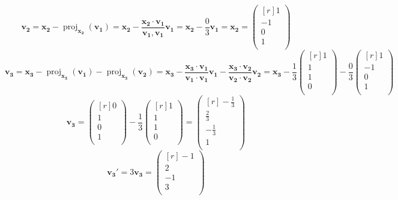 \documentclass{article}
\begin{document}
\[
\mathbf{v_2} = \mathbf{x_2} - \operatorname{proj}_{\mathbf{x_2}}(\mathbf{v_1}) = \mathbf{x_2} - \frac{\mathbf{x_2} \cdot \mathbf{v_1}}{\mathbf{v_1}, \mathbf{v_1}} \mathbf{v_1} = \mathbf{x_2} - \frac{0}{3}\mathbf{v_1} = \mathbf{x_2} = \begin{pmatrix*}[r]
 1 \\
 -1 \\
 0 \\
 1 \\
\end{pmatrix*}
\]
\[
\mathbf{v_3} = \mathbf{x_3} - \operatorname{proj}_{\mathbf{x_3}}(\mathbf{v_1}) - \operatorname{proj}_{\mathbf{x_3}}(\mathbf{v_2}) = \mathbf{x_3} - \frac{\mathbf{x_3} \cdot \mathbf{v_1}}{\mathbf{v_1} \cdot \mathbf{v_1}} \mathbf{v_1} - \frac{\mathbf{x_3} \cdot \mathbf{v_2}}{\mathbf{v_2} \cdot \mathbf{v_2}} \mathbf{v_2} = \mathbf{x_3} - \frac{1}{3}\begin{pmatrix*}[r]
 1 \\
 1 \\
 1 \\
 0 \\
\end{pmatrix*}  - 
\frac{0}{3} \begin{pmatrix*}[r]
 1 \\
 -1 \\
 0 \\
 1 \\
\end{pmatrix*}
\]
\[
\mathbf{v_3} = \begin{pmatrix*}[r]
 0 \\
 1 \\
 0 \\
 1 \\
\end{pmatrix*} - 
\frac{1}{3}
\begin{pmatrix*}[r]
 1 \\
 1 \\
 1 \\
 0 \\
\end{pmatrix*} = 
\begin{pmatrix*}[r]
 -\frac{1}{3} \\
 \frac{2}{3} \\
 -\frac{1}{3} \\
 1 \\
\end{pmatrix*}
\]
\[
\mathbf{v_3}' = 3\mathbf{v_3} = 
\begin{pmatrix*}[r]
 -1 \\
 2 \\
 -1 \\
 3 \\
\end{pmatrix*}
\]
\end{document}
